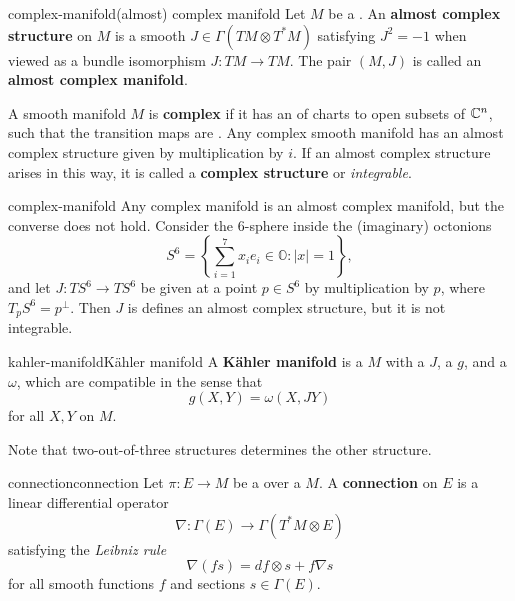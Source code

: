 \begin{topic}{complex-manifold}{(almost) complex manifold}
    Let $M$ be a . An \textbf{almost complex structure} on $M$ is a smooth  $J \in \Gamma(TM \otimes T^*M)$ satisfying $J^2 = -1$ when viewed as a bundle isomorphism $J \colon TM \to TM$. The pair $(M, J)$ is called an \textbf{almost complex manifold}.
    
    A smooth manifold $M$ is \textbf{complex} if it has an  of charts to open subsets of $\mathbb{C}^n$, such that the transition maps are . Any complex smooth manifold has an almost complex structure given by multiplication by $i$. If an almost complex structure arises in this way, it is called a \textbf{complex structure} or \textit{integrable}.
 \end{topic}
 
 \begin{example}{complex-manifold}
    Any complex manifold is an almost complex manifold, but the converse does not hold. Consider the $6$-sphere inside the (imaginary) octonions
     \[ S^6 = \left\{ \sum_{i = 1}^{7} x_i e_i \in \mathbb{O} : |x| = 1 \right\} , \]
     and let $J \colon TS^6 \to TS^6$ be given at a point $p \in S^6$ by multiplication by $p$, where $T_p S^6 = p^\perp$. Then $J$ is defines an almost complex structure, but it is not integrable.
 \end{example}

\begin{topic}{kahler-manifold}{Kähler manifold}
    A \textbf{Kähler manifold} is a  $M$ with a  $J$, a  $g$, and a  $\omega$, which are compatible in the sense that
    \[ g(X, Y) = \omega(X, JY) \]
    for all  $X, Y$ on $M$.
    
    Note that two-out-of-three structures determines the other structure.
\end{topic}

\begin{topic}{connection}{connection}
    Let $\pi \colon E \to M$ be a  over a  $M$. A \textbf{connection} on $E$ is a linear differential operator
    \[ \nabla \colon \Gamma(E) \to \Gamma(T^*M \otimes E) \]
    satisfying the \textit{Leibniz rule}
    \[ \nabla(fs) = df \otimes s + f \nabla s \]
    for all smooth functions $f$ and sections $s \in \Gamma(E)$.
\end{topic}

